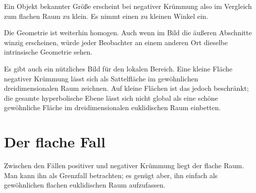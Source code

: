 Ein Objekt bekannter Größe erscheint bei negativer Krümmung also im Vergleich zum flachen Raum zu klein. Es nimmt einen zu kleinen Winkel ein.

Die Geometrie ist weiterhin homogen. Auch wenn im Bild die äußeren Abschnitte winzig erscheinen, würde jeder Beobachter an einem anderen Ort dieselbe intrinsische Geometrie sehen.

\begin{classroomqa}
\end{classroomqa}

\begin{classroomqa}
\end{classroomqa}

\begin{classroomqa}
\end{classroomqa}

Es gibt auch ein nützliches Bild für den lokalen Bereich. Eine kleine Fläche negativer Krümmung lässt sich als Sattelfläche im gewöhnlichen dreidimensionalen Raum zeichnen. Auf kleine Flächen ist das jedoch beschränkt; die gesamte hyperbolische Ebene lässt sich nicht global als eine schöne gewöhnliche Fläche im dreidimensionalen euklidischen Raum einbetten.

\section{Der flache Fall}

Zwischen den Fällen positiver und negativer Krümmung liegt der flache Raum. Man kann ihn als Grenzfall betrachten; es genügt aber, ihn einfach als gewöhnlichen flachen euklidischen Raum aufzufassen.

